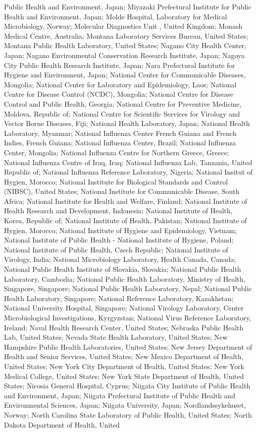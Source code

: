 Public Health and Environment, Japan; Miyazaki Prefectural Institute for Public Health and Environment, Japan; Molde Hospital, Laboratory for Medical Microbiology, Norway; Molecular Diagnostics Unit , United Kingdom; Monash Medical Centre, Australia; Montana Laboratory Services Bureau, United States; Montana Public Health Laboratory, United States; Nagano City Health Center, Japan; Nagano Environmental Conservation Research Institute, Japan; Nagoya City Public Health Research Institute, Japan; Nara Prefectural Institute for Hygiene and Environment, Japan; National Center for Communicable Diseases, Mongolia; National Center for Laboratory and Epidemiology, Laos; National Centre for Disease Control (NCDC), Mongolia; National Centre for Disease Control and Public Health, Georgia; National Centre for Preventive Medicine, Moldova, Republic of; National Centre for Scientific Services for Virology and Vector Borne Diseases, Fiji; National Health Laboratory, Japan; National Health Laboratory, Myanmar; National Influenza Center French Guiana and French Indies, French Guiana; National Influenza Center, Brazil; National Influenza Center, Mongolia; National Influenza Centre for Northern Greece, Greece; National Influenza Centre of Iraq, Iraq; National Influenza Lab, Tanzania, United Republic of; National Influenza Reference Laboratory, Nigeria; National Insitut of Hygien, Morocco; National Institute for Biological Standards and Control (NIBSC), United States; National Institute for Communicable Disease, South Africa; National Institute for Health and Welfare, Finland; National Institute of Health Research and Development, Indonesia; National Institute of Health, Korea, Republic of; National Institute of Health, Pakistan; National Institute of Hygien, Morocco; National Institute of Hygiene and Epidemiology, Vietnam; National Institute of Public Health - National Institute of Hygiene, Poland; National Institute of Public Health, Czech Republic; National Institute of Virology, India; National Microbiology Laboratory, Health Canada, Canada; National Public Health Institute of Slovakia, Slovakia; National Public Health Laboratory, Cambodia; National Public Health Laboratory, Ministry of Health, Singapore, Singapore; National Public Health Laboratory, Nepal; National Public Health Laboratory, Singapore; National Reference Laboratory, Kazakhstan; National University Hospital, Singapore; National Virology Laboratory, Center Microbiological Investigations, Kyrgyzstan; National Virus Reference Laboratory, Ireland; Naval Health Research Center, United States; Nebraska Public Health Lab, United States; Nevada State Health Laboratory, United States; New Hampshire Public Health Laboratories, United States; New Jersey Department of Health and Senior Services, United States; New Mexico Department of Health, United States; New York City Department of Health, United States; New York Medical College, United States; New York State Department of Health, United States; Nicosia General Hospital, Cyprus; Niigata City Institute of Public Health and Environment, Japan; Niigata Prefectural Institute of Public Health and Environmental Sciences, Japan; Niigata University, Japan; Nordlandssykehuset, Norway; North Carolina State Laboratory of Public Health, United States; North Dakota Department of Health, United 